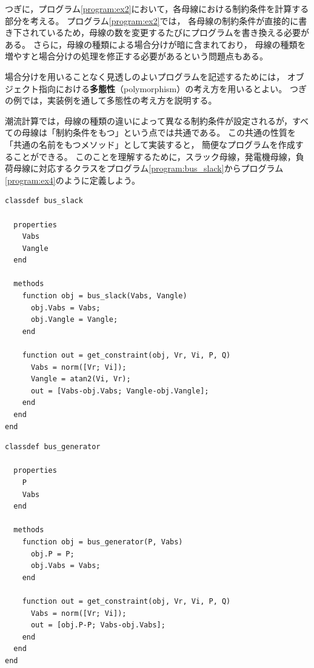 \documentclass[tombow,dvipdfmx]{corona-a5-1.1}
\begin{document}
つぎに，プログラム\nobreak\ref{program:ex2}において，各母線における制約条件を計算する部分を考える。
プログラム\nobreak\ref{program:ex2}では，
各母線の制約条件が直接的に書き下されているため，母線の数を変更するたびにプログラムを書き換える必要がある。
さらに，母線の種類による場合分けが暗に含まれており，
母線の種類を増やすと場合分けの処理を修正する必要があるという問題点もある。

場合分けを用いることなく見透しのよいプログラムを記述するためには，
オブジェクト指向における\textbf{多態性}（polymorphism）の考え方を用いるとよい。
つぎの例では，実装例を通して多態性の考え方を説明する。

\begin{例}[多態性を用いた潮流計算の実装例]
潮流計算では，母線の種類の違いによって異なる制約条件が設定されるが，すべての母線は「制約条件をもつ」という点では共通である。
この共通の性質を「共通の名前をもつメソッド」として実装すると，
簡便なプログラムを作成することができる。
このことを理解するために，スラック母線，発電機母線，負荷母線に対応するクラスをプログラム\nobreak\ref{program:bus_slack}からプログラム\nobreak\ref{program:ex4}のように定義しよう。

\smallskip
\begin{PROGRAMA}[count,title={bus\_slack.m}]\label{program:bus_slack}
\begin{verbatim}
classdef bus_slack
  
  properties
    Vabs
    Vangle
  end
  
  methods
    function obj = bus_slack(Vabs, Vangle)
      obj.Vabs = Vabs;
      obj.Vangle = Vangle;
    end
    
    function out = get_constraint(obj, Vr, Vi, P, Q)
      Vabs = norm([Vr; Vi]);
      Vangle = atan2(Vi, Vr);
      out = [Vabs-obj.Vabs; Vangle-obj.Vangle];
    end
  end
end
\end{verbatim}
\end{PROGRAMA}

\smallskip
\begin{PROGRAMA}[count,title={bus\_genertor.m}]\label{program:bus_PV}
\begin{verbatim}
classdef bus_generator
  
  properties
    P
    Vabs
  end
  
  methods
    function obj = bus_generator(P, Vabs)
      obj.P = P;
      obj.Vabs = Vabs;
    end
    
    function out = get_constraint(obj, Vr, Vi, P, Q)
      Vabs = norm([Vr; Vi]);
      out = [obj.P-P; Vabs-obj.Vabs];
    end
  end
end
\end{verbatim}
\end{PROGRAMA}


\end{例}
\end{document}
